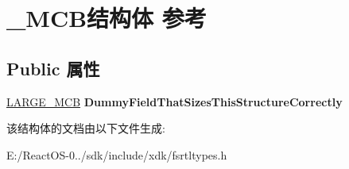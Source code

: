\hypertarget{struct___m_c_b}{}\section{\+\_\+\+M\+C\+B结构体 参考}
\label{struct___m_c_b}
\subsection*{Public 属性}
\begin{DoxyCompactItemize}
\item 
\mbox{\label{struct___m_c_b_a5d467201b28c27036cfaa3e910fab675}} 
\hyperlink{struct___l_a_r_g_e___m_c_b}{L\+A\+R\+G\+E\+\_\+\+M\+CB} {\bfseries Dummy\+Field\+That\+Sizes\+This\+Structure\+Correctly}
\end{DoxyCompactItemize}


该结构体的文档由以下文件生成\+:\begin{DoxyCompactItemize}
\item 
E\+:/\+React\+O\+S-\/0../sdk/include/xdk/fsrtltypes.\+h\end{DoxyCompactItemize}
